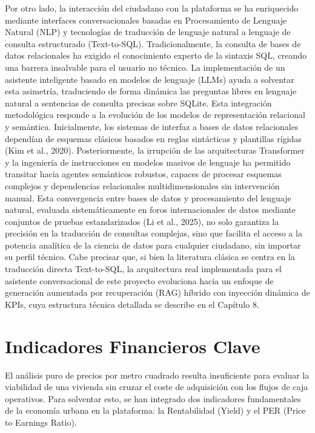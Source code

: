 \documentclass[a4paper,11pt,openany]{book}
\begin{document}
Por otro lado, la interacción del ciudadano con la plataforma se ha enriquecido mediante interfaces conversacionales basadas en Procesamiento de Lenguaje Natural (NLP) y tecnologías de traducción de lenguaje natural a lenguaje de consulta estructurado (Text-to-SQL). Tradicionalmente, la consulta de bases de datos relacionales ha exigido el conocimiento experto de la sintaxis SQL, creando una barrera insalvable para el usuario no técnico. La implementación de un asistente inteligente basado en modelos de lenguaje (LLMs) ayuda a solventar esta asimetría, traduciendo de forma dinámica las preguntas libres en lenguaje natural a sentencias de consulta precisas sobre SQLite. Esta integración metodológica responde a la evolución de los modelos de representación relacional y semántica. Inicialmente, los sistemas de interfaz a bases de datos relacionales dependían de esquemas clásicos basados en reglas sintácticas y plantillas rígidas (Kim et al., 2020). Posteriormente, la irrupción de las arquitecturas Transformer y la ingeniería de instrucciones en modelos masivos de lenguaje ha permitido transitar hacia agentes semánticos robustos, capaces de procesar esquemas complejos y dependencias relacionales multidimensionales sin intervención manual. Esta convergencia entre bases de datos y procesamiento del lenguaje natural, evaluada sistemáticamente en foros internacionales de datos mediante conjuntos de pruebas estandarizados (Li et al., 2025), no solo garantiza la precisión en la traducción de consultas complejas, sino que facilita el acceso a la potencia analítica de la ciencia de datos para cualquier ciudadano, sin importar su perfil técnico. Cabe precisar que, si bien la literatura clásica se centra en la traducción directa Text-to-SQL, la arquitectura real implementada para el asistente conversacional de este proyecto evoluciona hacia un enfoque de generación aumentada por recuperación (RAG) híbrido con inyección dinámica de KPIs, cuya estructura técnica detallada se describe en el Capítulo 8.

\section{Indicadores Financieros Clave}
El análisis puro de precios por metro cuadrado resulta insuficiente para evaluar la viabilidad de una vivienda sin cruzar el coste de adquisición con los flujos de caja operativos. Para solventar esto, se han integrado dos indicadores fundamentales de la economía urbana en la plataforma: la Rentabilidad (Yield) y el PER (Price to Earnings Ratio).
\end{document}
